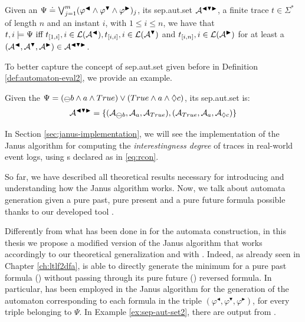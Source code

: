 \begin{theorem}\label{th:sepautset-eval2}
Given an \rcon\xspace $\Psi \doteq \bigvee^{m}_{j=1} (\varphi^{\blacktriangleleft} \wedge \varphi^{\blacktriangledown} \wedge \varphi^{\blacktriangleright})_j$, its sep.aut.set $\mathcal{A}^{\blacktriangleleft \blacktriangledown \blacktriangleright}$, a finite trace $t \in \Sigma^*$ of length $n$ and an instant $i$, with $1 \le i \le n$, we have that $t,i \models \Psi \ \text{iff}\  t_{[1,i]}, i \in \mathcal{L}(\mathcal{A}^\blacktriangleleft), t_{[i,i]}, i \in \mathcal{L}(\mathcal{A}^\blacktriangledown)$ and $t_{[i,n]}, i \in \mathcal{L}(\mathcal{A}^\blacktriangleright)$ for at least a $(\mathcal{A}^{\blacktriangleleft}, \mathcal{A}^{\blacktriangledown}, \mathcal{A}^{\blacktriangleright}) \in \mathcal{A}^{\blacktriangleleft \blacktriangledown \blacktriangleright}$.
\end{theorem}

To better capture the concept of sep.aut.set given before in Definition \ref{def:automaton-eval2}, we provide an example.
\begin{example}\label{ex:automata-sep-formulas2}
Given the \rcon\xspace $\Psi = (\Yesterday b \lAND a \lAND True) \lOR (True \lAND a \lAND \Diamond c)$, its sep.aut.set is:
\begin{align*}
\automaton^{\blacktriangleleft \blacktriangledown \blacktriangleright} = \{(\automaton_{\Yesterday b}, \automaton_{a}, \automaton_{True}), (\automaton_{True}, \automaton_{a}, \automaton_{\Diamond c})\}
\end{align*}
\end{example}

In Section \ref{sec:janus-implementation}, we will see the implementation of the Janus algorithm for computing the \emph{interestingness degree} of traces in real-world event logs, using \rcon s declared as in \ref{eq:rcon}.

So far, we have described all theoretical results necessary for introducing and understanding how the Janus algorithm works. Now, we talk about automata generation given a pure past, pure present and a pure future formula possible thanks to our developed tool \LTLfToDFA. 

Differently from what has been done in \cite{cecconi2018interestingness} for the automata construction, in this thesis we propose a modified version of the Janus algorithm that works accordingly to our theoretical generalization and with \LTLfToDFA. Indeed, as already seen in Chapter \ref{ch:ltlf2dfa}, \LTLfToDFA is able to directly generate the minimum \DFA for a pure past formula (\PLTL) without passing through its pure future (\LTLf) reversed formula. In particular, \LTLfToDFA has been employed in the Janus algorithm for the generation of the automaton corresponding to each formula in the triple $(\varphi^{\blacktriangleleft},\varphi^{\blacktriangledown},\varphi^{\blacktriangleright})$, for every triple belonging to $\Psi$. In Example \ref{ex:sep-aut-set2}, there are \DFAs output from \LTLfToDFA.

